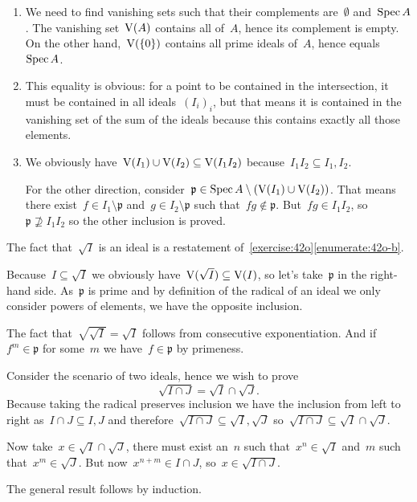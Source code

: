 \begin{exercise}
  \label{exercise:44c}
  \begin{enumerate}
    \item\label{enumerate:44c-a} We need to find vanishing sets such that their complements are~$\emptyset$ and~$\operatorname{Spec} A$. The vanishing set~$\operatorname{V}(A)$ contains all of~$A$, hence its complement is empty. On the other hand,~$\operatorname{V}(\left\{ 0 \right\})$ contains all prime ideals of~$A$, hence equals~$\operatorname{Spec} A$.

    \item This equality is obvious: for a point to be contained in the intersection, it must be contained in all ideals~$(I_i)_i$, but that means it is contained in the vanishing set of the sum of the ideals because this contains exactly all those elements.

    \item We obviously have~$\operatorname{V}(I_1)\cup\operatorname{V}(I_2)\subseteq\operatorname{V}(I_1I_2)$ because~$I_1I_2\subseteq I_1,I_2$.

      For the other direction, consider~$\mathfrak{p}\in\operatorname{Spec} A\setminus(\operatorname{V}(I_1)\cup\operatorname{V}(I_2))$. That means there exist~$f\in I_1\setminus\mathfrak{p}$ and~$g\in I_2\setminus\mathfrak{p}$ such that~$fg\notin\mathfrak{p}$. But~$fg\in I_1I_2$, so~$\mathfrak{p}\nsupseteq I_1I_2$ so the other inclusion is proved.
  \end{enumerate}
\end{exercise}

\begin{exercise} %
  \label{exercise:44d}
  The fact that~$\sqrt{I}$ is an ideal is a restatement of~\autoref{exercise:42o}\ref{enumerate:42o-b}.
  
  Because~$I\subseteq\sqrt{I}$ we obviously have~$\operatorname{V}(\sqrt{I})\subseteq\operatorname{V}(I)$, so let's take~$\mathfrak{p}$ in the right-hand side. As~$\mathfrak{p}$ is prime and by definition of the radical of an ideal we only consider powers of elements, we have the opposite inclusion.

  The fact that~$\sqrt{\sqrt{I}}=\sqrt{I}$ follows from consecutive exponentiation. And if~$f^m\in\mathfrak{p}$ for some~$m$ we have~$f\in\mathfrak{p}$ by primeness.
\end{exercise}

\begin{exercise}
  Consider the scenario of two ideals, hence we wish to prove
  \begin{equation}
    \sqrt{I\cap J}=\sqrt{I}\cap\sqrt{J}.
  \end{equation}
  Because taking the radical preserves inclusion we have the inclusion from left to right as~$I\cap J\subseteq I,J$ and therefore~$\sqrt{I\cap J}\subseteq\sqrt{I},\sqrt{J}$ so~$\sqrt{I\cap J}\subseteq\sqrt{I}\cap\sqrt{J}$.
  
  Now take~$x\in\sqrt{I}\cap\sqrt{J}$, there must exist an~$n$ such that~$x^n\in\sqrt{I}$ and~$m$ such that~$x^m\in\sqrt{J}$. But now~$x^{n+m}\in I\cap J$, so~$x\in\sqrt{I\cap J}$.

  The general result follows by induction.
\end{exercise}

